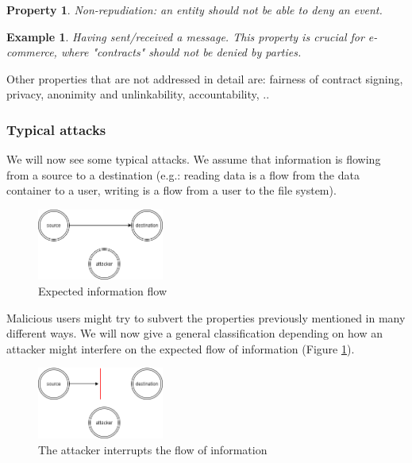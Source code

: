 \documentclass[a4paper, 12pt]{report}
\newtheorem{property}{\textbf{Property}}
\newtheorem{example}{\textbf{Example}}
\begin{document}
\vspace{5mm}
\begin{property}
	Non-repudiation: an entity should not be able to deny an event. 
\end{property}
\begin{example}
	Having sent/received a message. This property is crucial for e-commerce, where "contracts" should not be denied by parties.
\end{example}
\vspace{5mm}
Other properties that are not addressed in detail are: fairness of contract signing, privacy, anonimity and unlinkability, accountability, ..
\subsubsection{Typical attacks}
We will now see some typical attacks. We assume that information is flowing from a source to a destination (e.g.: reading data is a flow from the data container to a user, writing is a flow from a user to the file system).\\

\begin{figure}
	\includegraphics[width=0.37\textwidth]{images/attacks1.png}
	\caption{Expected information flow}
	\label{fig:attacks1}
\end{figure}
Malicious users might try to subvert the properties previously mentioned in many different ways. We will now give a general classification depending on how an attacker might interfere on the expected flow of information (Figure \ref{fig:attacks1}).

\begin{figure}
	\includegraphics[width=0.37\textwidth]{images/attacks2.png}
	\caption{The attacker interrupts the flow of information}
	\label{fig:attacks2}
\end{figure}
\end{document}
